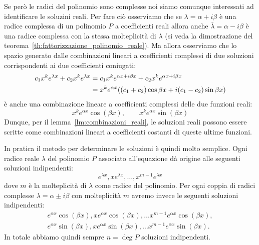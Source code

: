 Se però le radici del polinomio sono complesse noi siamo comunque interessati ad identificare 
le soluzini reali.
Per fare ciò osserviamo che se $\lambda = \alpha + i \beta $ è una radice complessa di un polinomio $P$ a coefficienti 
reali allora anche $\bar \lambda =\alpha - i \beta$ è una radice complessa con la stessa molteplicità di $\lambda$
(si veda la dimostrazione del teorema~\ref{th:fattorizzazione_polinomio_reale}). 
Ma allora osserviamo che lo spazio generato dalle combinazioni lineari a coefficienti complessi
di due soluzioni corrispondenti ai due coefficienti coniugati:
\begin{align*}
  c_1 x^k e^{\lambda x} + c_2  x^k e^{\lambda x}
  &= c_1 x^k e^{\alpha x+i \beta x} + c_2 x^k e^{\alpha x+ i \beta x}\\
  &= x^k e^{\alpha x}{\left( (c_1+c_2) \cos \beta x + i (c_1-c_2) \sin \beta x \right)}
\end{align*}
è anche una combinazione lineare a coefficienti complessi delle due funzioni reali:
\begin{equation}\label{eq:489571798}
  x^k e^{\alpha x} \cos(\beta x), \qquad
  x^k e^{\alpha x} \sin(\beta x)
\end{equation}
Dunque, per il lemma~\ref{lm:combinazioni_reali}, 
le soluzioni reali possono essere scritte come combinazioni lineari a coefficienti 
costanti di queste ultime funzioni.

In pratica il metodo per determinare le soluzioni è quindi molto semplice. 
Ogni radice reale $\lambda$ del polinomio $P$ associato all'equazione dà origine 
alle seguenti soluzioni indipendenti:
\[
  e^{\lambda x}, x e^{\lambda x}, \dots, x^{m-1} e^{\lambda x}
\]
dove $m$ è la molteplicità di $\lambda$ come radice del polinomio.
Per ogni coppia di radici complesse $\lambda = \alpha \pm i \beta$ con molteplicità $m$ 
avremo invece le seguenti soluzioni indipendenti:
\begin{gather*}
  e^{\alpha x}\cos(\beta x), x e^{\alpha x}\cos(\beta x), \dots x^{m-1} e^{\alpha x}\cos(\beta x),\\
  e^{\alpha x}\sin(\beta x), x e^{\alpha x}\sin(\beta x), \dots x^{m-1} e^{\alpha x}\sin(\beta x).
\end{gather*}
In totale abbiamo quindi sempre $n=\deg P$ soluzioni indipendenti.

